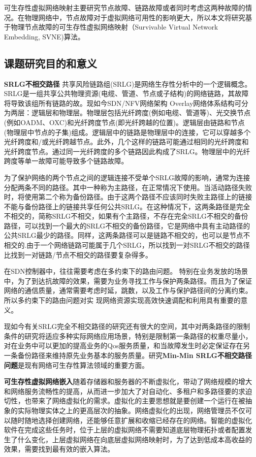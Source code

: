 可生存性虚拟网络映射主要研究节点故障、链路故障或者同时考虑这两种故障的情况。在物理网络中，节点故障对于虚拟网络可用性的影响更大，所以本文将研究基于物理节点故障的可生存性虚拟网络映射（Survivable Virtual Network Embedding, SVNE)算法。


\subsection{课题研究目的和意义}
\textbf{SRLG不相交路径}
共享风险链路组(SRLG)是网络生存性分析中的一个逻辑概念。SRLG是一组共享公共物理资源(电缆、管道、节点或子结构)的网络链路，其故障将导致该组所有链路的故。现如今SDN/NFV网络架构 Overlay网络体系结构可分为两层：逻辑层和物理层。物理层包括光纤跨度(例如电缆、管道等)、光交换节点(例如OADM、OXC)和光纤跨度节点(即光纤跨越的位置)。逻辑层由链路和节点(物理层中节点的子集)组成。逻辑层中的链路是物理层中的连接，它可以穿越多个光纤跨度和/或光纤跨越节点。此外，几个这样的链路可能通过相同的光纤跨度和光纤跨度节点。通过同一光纤跨度的多个链路因此构成了SRLG。物理层中的光纤跨度等单一故障可能导致多个链路故障。

为了保护网络的两个节点之间的逻辑连接不受单个SRLG故障的影响，通常为连接分配两条不同的路径。其中一种称为主路径，在正常情况下使用。当活动路径失败时，将使用第二个称为备份路径。由于这两个路径不应该同时失败主路径上的链接不能与备份路径上的链接共享任何公共SRLG。在这种情况下，这两条路径是完全不相交的，简称SRLG不相交，如果有个主路径，不存在完全SRLG不相交的备份路径，可以找到一个最大的SRLG不相交的备份路径，它是网络中具有主动路径的公共SRLG最少的路径。同样，这两条路径可以是链路不相交的，也可以是节点不相交的.由于一个网络链路可能属于几个SRLG，所以找到一对SRLG不相交的路径比找到一对链路/节点不相交的路径要复杂得多。

在SDN控制器中，往往需要考虑在多约束下的路由问题\cite{akyildiz2014roadmap}。 特别在业务发放的场景中，为了到达抗故障的效果，需要为业务寻找工作与保护两条路径。而且为了保证网络的通信质量，通常需要考虑时延，跳数，以及工作与保护路径间的分离约束。所以多约束下的路由问题对实 现网络资源实现高效快速调配和利用具有重要的意义。


现如今有关SRLG完全不相交路径的研究还有很大的空间，其中对两条路径的限制条件的研究将适应多种实际网络应用场景，特别是限制第一条路径的权重尽量小，对在业务中可以更加的提高业务的Qos服务质量，和当故障发生时必定保证存在另一条备份路径来维持原先业务基本的服务质量。研究\textbf{Min-Min SRLG不相交路径问题}是现有网络可生存性算法领域的重要方面。

\textbf{可生存性虚拟网络嵌入}随着存储器和服务器的不断虚拟化，带动了网络规模的增大和网络服务流畅性的提高，从而进一步加大了对自动化、多租户和多路径要的求迫切性，也带来了网络虚拟化的需求。虚拟化的主要思想就是要创建一个运行在被抽象的实际物理实体之上的更高层次的抽象。网络虚拟化的出现，网络管理员不仅可以随时随地选择创建网络，还能够任意扩展和收缩已经存在的网络。智能的虚拟化软件在完成这些任务时，位于上层的虚拟网络不需要知道底层物理拓扑或者配置发生了什么变化，上层虚拟网络在向底层虚拟网络映射时，为了达到低成本高收益的效果，需要找到最有效的嵌入算法。

